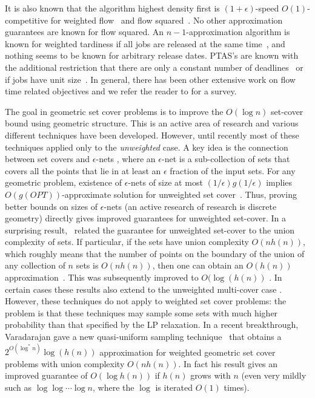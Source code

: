 \documentclass[11pt]{article}
\begin{document}
It is also known that the algorithm highest density first is 
$(1+\epsilon)$-speed $O(1)$-competitive for weighted flow~\cite{BecchettiLMP06}
and flow squared~\cite{BansalP03}. No other approximation guarantees
are known for flow squared.
An $n-1$-approximation algorithm is known for weighted tardiness if
all jobs are released at the same time~\cite{Cheng2005}, and nothing seems to be known for arbitrary release dates.
PTAS's are known with the additional restriction that there are only a constant
number of deadlines~\cite{KarakostasKW09} or if jobs  have unit 
size~\cite{Lawler1982}. In general, there has been other extensive work on flow time related objectives and we refer the reader to  \cite{PST} for a survey.


The goal in geometric set cover problems is to improve the $O(\log n)$ set-cover bound using 
geometric structure. This is an active area of research and various different techniques have been developed.
However, until recently most of these techniques applied only to the {\em unweighted} case. 
A key idea is the connection between set covers and  
$\epsilon$-nets  \cite{BronnimannG95}, where an $\epsilon$-net is a sub-collection of sets that covers all the points that lie in at least an $\epsilon$ fraction of the input sets. 
For any geometric problem, existence of 
 $\epsilon$-nets of size at most $(1/\epsilon) g(1/\epsilon)$ implies $O(g(OPT))$-approximate solution for unweighted set cover~\cite{BronnimannG95}.
Thus, proving better bounds on sizes of $\epsilon$-nets  (an active research of research
is discrete geometry) directly gives improved guarantees for unweighted set-cover.
In a surprising result,~\cite{ClarksonV07} related the guarantee for unweighted set-cover
to the union complexity of sets.
If particular, if the sets have union complexity $O(n h(n))$,
which roughly means that the number of points on the boundary of
the union of any collection of $n$ sets is $O(n h(n))$,
then one can obtain an $O(h(n))$ approximation~\cite{ClarksonV07}. This was subsequently improved 
to $O(\log (h(n))$ \cite{Varadarajan09}.
In certain cases these results also extend to the  unweighted multi-cover case \cite{CCS}.
However, these techniques do not apply to weighted set cover problems: the problem is that
these techniques may sample some sets with much higher 
probability than that specified by the LP relaxation. 
In a recent breakthrough,  Varadarajan gave a new quasi-uniform sampling technique~\cite{Varadarajan10}
that obtains a $ 2^{O(\log^* n)} \log(h(n))$ approximation for weighted geometric set cover problems
with union complexity $O(nh(n))$. In fact his result gives an improved guarantee of $O(\log h(n))$ if $h(n)$ grows with $n$ (even very mildly such as $\log \log \cdots \log n$, where the $\log$ is iterated  $O(1)$ times).
\end{document}
